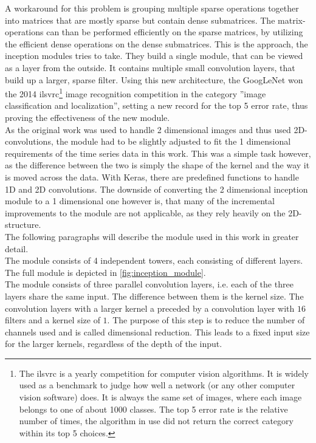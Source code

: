 A workaround for this problem is grouping multiple sparse operations together into matrices that are mostly sparse but contain dense submatrices. The matrix-operations can than be performed efficiently on the sparse matrices, by utilizing the efficient dense operations on the dense submatrices. This is the approach, the inception modules tries to take. They build a single module, that can be viewed as a layer from the outside. It contains multiple small convolution layers, that build up a larger, sparse filter. Using this new architecture, the GoogLeNet won the 2014 \gls{ilsvrc}\footnote{The \gls{ilsvrc} is a yearly competition for computer vision algorithms. It is widely used as a benchmark to judge how well a network (or any other computer vision software) does. It is always the same set of images, where each image belongs to one of about 1000 classes. The top 5 error rate is the relative number of times, the algorithm in use did not return the correct category within its top 5 choices.} image recognition competition in the category ''image classification and localization'', setting a new record for the top 5 error rate, thus proving the effectiveness of the new module. \cite{inception_module, ILSVRC15}\\
As the original work was used to handle 2 dimensional images and thus used 2D-convolutions, the module had to be slightly adjusted to fit the 1 dimensional requirements of the time series data in this work. This was a simple task however, as the difference between the two is simply the shape of the kernel and the way it is moved across the data. With Keras, there are predefined functions to handle 1D and 2D convolutions. The downside of converting the 2 dimensional inception module to a 1 dimensional one however is, that many of the incremental improvements to the module are not applicable, as they rely heavily on the 2D-structure. \cite{inception_v2_v3, inception_v4}\medskip\\
The following paragraphs will describe the module used in this work in greater detail.\\
The module consists of 4 independent towers, each consisting of different layers. The full module is depicted in \autoref{fig:inception_module}.\\
The module consists of three parallel convolution layers, i.e. each of the three layers share the same input. The difference between them is the kernel size. The convolution layers with a larger kernel a preceded by a convolution layer with $16$ filters and a kernel size of $1$. The purpose of this step is to reduce the number of channels used and is called dimensional reduction. This leads to a fixed input size for the larger kernels, regardless of the depth of the input. 
